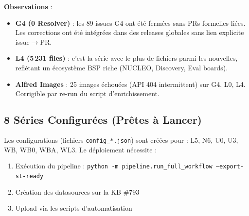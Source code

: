 \textbf{Observations} :
\begin{itemize}
  \item \textbf{G4 (0 Resolver)} : les 89 issues G4 ont été fermées sans PRs formelles liées. Les corrections ont été intégrées dans des releases globales sans lien explicite issue$\to$PR.
  \item \textbf{L4 (5\,231 files)} : c'est la série avec le plus de fichiers parmi les nouvelles, reflétant un écosystème BSP riche (NUCLEO, Discovery, Eval boards).
  \item \textbf{Alfred Images} : 25 images échouées (API 404 intermittent) sur G4, L0, L4. Corrigible par re-run du script d'enrichissement.
\end{itemize}

\subsection{8 Séries Configurées (Prêtes à Lancer)}

Les configurations (fichiers \texttt{config\_*.json}) sont créées pour : L5, N6, U0, U3, WB, WB0, WBA, WL3. Le déploiement nécessite :
\begin{enumerate}
  \item Exécution du pipeline : \texttt{python -m pipeline.run\_full\_workflow --export-st-ready}
  \item Création des datasources sur la KB \#793
  \item Upload via les scripts d'automatisation
\end{enumerate}
